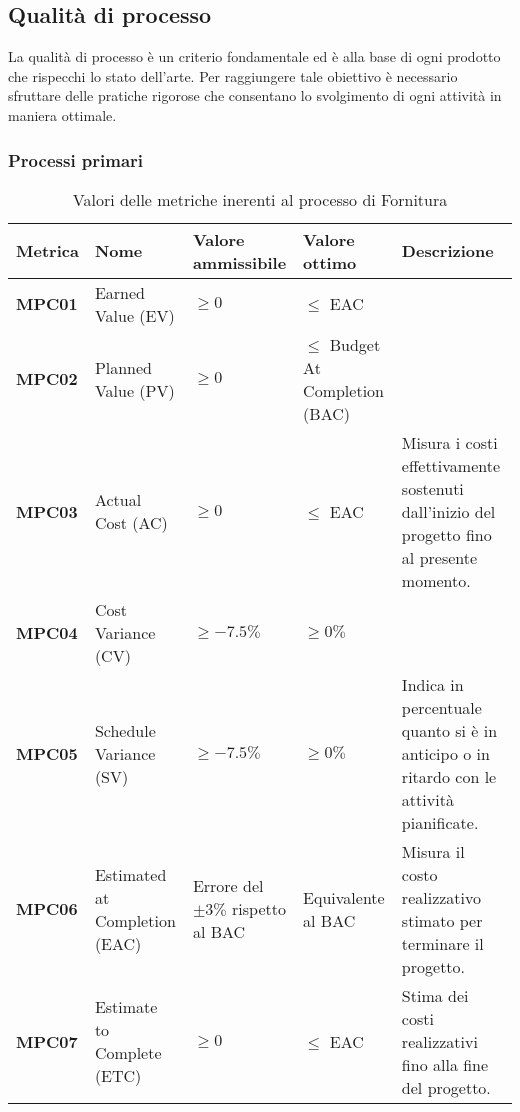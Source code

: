 \documentclass[italian,12pt]{article} %
\begin{document}
\subsection{Qualità di processo}
La qualità di processo è un criterio fondamentale ed è alla base di ogni prodotto
che rispecchi lo stato dell'arte. Per raggiungere tale obiettivo è necessario 
sfruttare delle pratiche rigorose che consentano lo svolgimento di ogni attività
in maniera ottimale.

\subsubsection{Processi primari}


	
\begin{table}[h!]
    \centering
    \begin{tabularx}{\textwidth}{|X|X|X|X|X|} 
		\hline
		\textbf{Metrica} 	& \textbf{Nome} & \textbf{Valore ammissibile} & \textbf{Valore ottimo}& \textbf{Descrizione}\\  	 
		\hline
		\textbf{MPC01} 	& Earned Value (EV) 			& $\geq 0$ 						& $\leq$ EAC &  \\
		\hline
		\textbf{MPC02} 	& Planned Value (PV) 			& $\geq 0$ 						& $\leq$ Budget At Completion (BAC) &  \\ 
		\hline
		\textbf{MPC03} 	& Actual Cost (AC) 				& $\geq 0$ 						& $\leq$ EAC &	Misura i costi effettivamente sostenuti dall'inizio del progetto fino al presente momento.\\ 
		\hline
		\textbf{MPC04} 	& Cost Variance (CV) 			& $\geq -7.5\%$ 				& $\geq 0\%$ & \\ 
		\hline
		\textbf{MPC05} 	& Schedule Variance (SV) 		& $\geq -7.5\%$ 				& $\geq 0\%$ &Indica in percentuale quanto si è in anticipo o in ritardo con le attività pianificate.\\ 
		\hline
		\textbf{MPC06} 	& Estimated at Completion (EAC) & Errore del $\pm 3\%$ rispetto al BAC  & Equivalente al BAC & Misura il costo realizzativo stimato per terminare il progetto.\\ 
		\hline
		\textbf{MPC07} 	& Estimate to Complete (ETC)  	& $\geq 0$						 & $\leq$ EAC & Stima dei costi realizzativi fino alla fine del progetto.\\ 
		\hline
    \end{tabularx}
    \caption{ Valori delle metriche inerenti al processo di Fornitura}
    \label{table:1}
\end{table}
\end{document}
